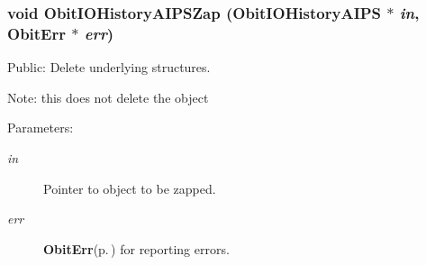 \subsubsection{\setlength{\rightskip}{0pt plus 5cm}void Obit\-IOHistory\-AIPSZap ({\bf Obit\-IOHistory\-AIPS} $\ast$ {\em in}, {\bf Obit\-Err} $\ast$ {\em err})}\label{ObitIOHistoryAIPS_8h_a9}


Public: Delete underlying structures. 

Note: this does not delete the object \begin{Desc}
\item[Parameters:]
\begin{description}
\item[{\em in}]Pointer to object to be zapped. \item[{\em err}]{\bf Obit\-Err}{\rm (p.\,\pageref{structObitErr})} for reporting errors. \end{description}
\end{Desc}
